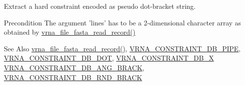 Extract a hard constraint encoded as pseudo dot-\/bracket string. 

\begin{DoxyPrecond}{Precondition}
The argument 'lines' has to be a 2-\/dimensional character array as obtained by \hyperlink{group__file__utils_ga8cfb7e271efc9e1f34640acb85475639}{vrna\-\_\-file\-\_\-fasta\-\_\-read\-\_\-record()} 
\end{DoxyPrecond}
\begin{DoxySeeAlso}{See Also}
\hyperlink{group__file__utils_ga8cfb7e271efc9e1f34640acb85475639}{vrna\-\_\-file\-\_\-fasta\-\_\-read\-\_\-record()}, \hyperlink{group__constraints_ga13053547a2de5532b64b64d35e097ae1}{V\-R\-N\-A\-\_\-\-C\-O\-N\-S\-T\-R\-A\-I\-N\-T\-\_\-\-D\-B\-\_\-\-P\-I\-P\-E}, \hyperlink{group__constraints_ga369bea82eae75fbe626f409fa425747e}{V\-R\-N\-A\-\_\-\-C\-O\-N\-S\-T\-R\-A\-I\-N\-T\-\_\-\-D\-B\-\_\-\-D\-O\-T}, \hyperlink{group__constraints_ga7283bbe0f8954f7b030ecc3f2d1932b2}{V\-R\-N\-A\-\_\-\-C\-O\-N\-S\-T\-R\-A\-I\-N\-T\-\_\-\-D\-B\-\_\-\-X} \hyperlink{group__constraints_gad54c1315a47d55653dcaa5de6e544b77}{V\-R\-N\-A\-\_\-\-C\-O\-N\-S\-T\-R\-A\-I\-N\-T\-\_\-\-D\-B\-\_\-\-A\-N\-G\-\_\-\-B\-R\-A\-C\-K}, \hyperlink{group__constraints_gac17b034852c914bc5879954c65d7e74b}{V\-R\-N\-A\-\_\-\-C\-O\-N\-S\-T\-R\-A\-I\-N\-T\-\_\-\-D\-B\-\_\-\-R\-N\-D\-\_\-\-B\-R\-A\-C\-K}
\end{DoxySeeAlso}

